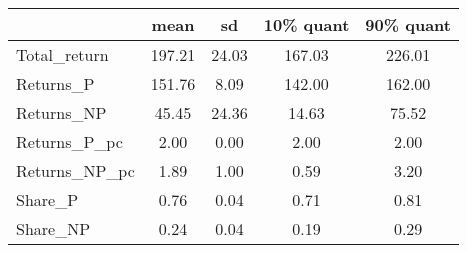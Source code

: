 \begin{tabular}{lcccc}
\toprule
{} &    mean &     sd &  10\% quant &  90\% quant \\
\midrule
Total\_return  &  197.21 &  24.03 &     167.03 &     226.01 \\
Returns\_P     &  151.76 &   8.09 &     142.00 &     162.00 \\
Returns\_NP    &   45.45 &  24.36 &      14.63 &      75.52 \\
Returns\_P\_pc  &    2.00 &   0.00 &       2.00 &       2.00 \\
Returns\_NP\_pc &    1.89 &   1.00 &       0.59 &       3.20 \\
Share\_P       &    0.76 &   0.04 &       0.71 &       0.81 \\
Share\_NP      &    0.24 &   0.04 &       0.19 &       0.29 \\
\bottomrule
\end{tabular}
